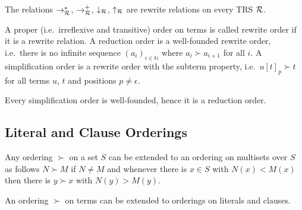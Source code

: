 \begin{lemma}
	The relations $\rightarrow^*_{\mathcal{R}}$,
	$\rightarrow^+_{\mathcal{R}}$,
	$\downarrow_{\mathcal{R}}$, $\uparrow_{\mathcal{R}}$ are rewrite relations on every TRS $\mathcal{R}$.
\end{lemma}
\begin{definition}
	A proper (i.e.~irreflexive and transitive) order on terms is called {\myem rewrite order} if it is a rewrite relation.
	A {\myem reduction order} is a well-founded rewrite order,
	i.e.~there is no infinite sequence
	$(a_i)_{i\in\mathbb{N}}$
	where $a_i\succ a_{i+1}$ for all $i$.
	A {\myem simplification order} is a rewrite order with the {\myem subterm property},
	i.e.~$u[t]_p \succ t$ for all terms $u$, $t$ and positions $p\neq\epsilon$.
\end{definition}
\begin{lemma}
	Every simplification order is well-founded, hence it is a reduction order.
\end{lemma}



\subsection{Literal and Clause Orderings}\label{sec:literal:clause:orderings}



\begin{lemma}
	Any ordering $\succ$ on a set $S$ can be extended to an ordering on multisets over $S$
	as follows $N \succ M$ if $N \neq M$
	and whenever there is $x\in S$ with $N(x) < M(x)$
	then there is $y \succ x$ with $N(y) > M(y)$.

	An ordering $\succ$ on terms can be extended to orderings on literals and clauses.
\end{lemma}

